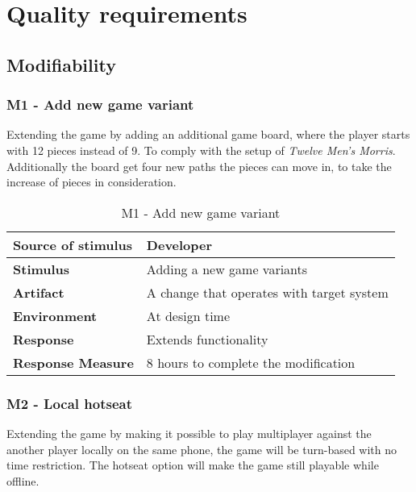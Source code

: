 \newpage

\section{Quality requirements}

\subsection{Modifiability}

\subsubsection{M1 - Add new game variant}

Extending the game by adding an additional game board, where the player starts with 12 pieces instead of 9. To comply  with the setup of \emph{Twelve Men's Morris}. Additionally the board get four new paths the pieces can move in, to take the increase of pieces in consideration.

\begin{table}[h!]
\begin{tabular}{ | p{110pt} | p{250pt}  |}
\hline
\bf Source of stimulus &  Developer  \\ \hline
\bf Stimulus & Adding a new game variants \\ \hline 
\bf Artifact & A change that operates with target system  \\  \hline
\bf Environment & At design time \\ \hline
\bf Response & Extends functionality \\ \hline
\bf Response Measure & 8 hours to complete the modification \\ \hline

\end{tabular}
\caption{M1 - Add new game variant}
\end{table}

\pagebreak

\subsubsection{M2 - Local hotseat}

Extending the game by making it possible to play multiplayer against the another player locally on the same phone, the game will be turn-based with no time restriction. The hotseat option will make the game still playable while offline.

